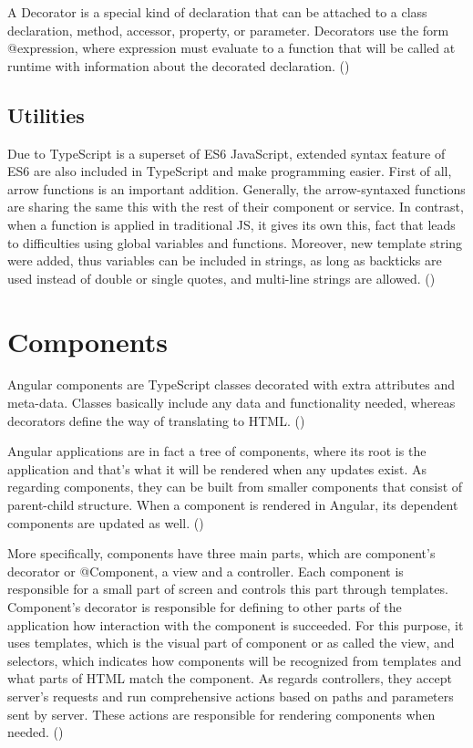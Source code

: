 A Decorator is a special kind of declaration that can be attached to a class declaration, method, accessor, property, or parameter. Decorators use the form @expression, where expression must evaluate to a function that will be called at runtime with information about the decorated declaration. (\cite{Typescript})

\subsection{Utilities}

Due to TypeScript is a superset of ES6 JavaScript, extended syntax feature of ES6 are also included in TypeScript and make programming easier. First of all, arrow functions is an important addition. Generally, the arrow-syntaxed functions are sharing the same this with the rest of their component or service. In contrast, when a function is applied in traditional JS, it gives its own this, fact that leads to difficulties using global variables and functions. Moreover, new template string were added, thus variables can be included in strings, as long as backticks are used instead of double or single quotes, and multi-line strings are allowed. (\cite{murray2018ng}) \par

\section{Components}

Angular components are TypeScript classes decorated with extra attributes and meta-data. Classes basically include any data and functionality needed, whereas decorators define the way of translating to HTML. (\cite{angularUpandRunning}) \par

Angular applications are in fact a tree of components, where its root is the application and that's what it will be rendered when any updates exist. As regarding components, they can be built from smaller components that consist of parent-child structure. When a component is rendered in Angular, its dependent components are updated as well. (\cite{murray2018ng}) \par

More specifically, components have three main parts, which are component's decorator or @Component, a view and a controller. Each component is responsible for a small part of screen and controls this part through templates. Component's decorator is responsible for defining to other parts of the application how interaction with the component is succeeded. For this purpose, it uses templates, which is the visual part of component or as called the view, and selectors, which indicates how components will be recognized from templates and what parts of HTML match the component. As regards controllers, they accept server's requests and run comprehensive actions based on paths and parameters sent by server. These actions are responsible for rendering components when needed. (\cite{murray2018ng}) \par

